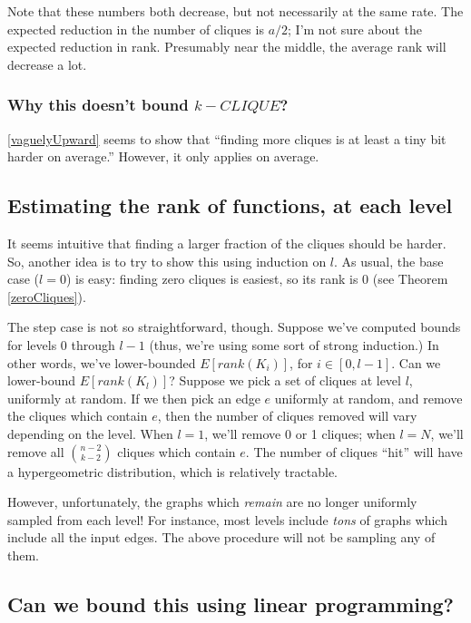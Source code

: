 \documentclass[12pt]{article}
\theoremstyle{definition}
\begin{document}
Note that these numbers both decrease, but not necessarily at the same rate.
The expected reduction in the number of cliques is $a/2$; I'm not sure
about the expected reduction in rank. Presumably near the middle, the
average rank will decrease a lot.

\subsubsection{Why this doesn't bound $k-CLIQUE$?}

\ref{vaguelyUpward} seems to show that ``finding more cliques is
at least a tiny bit harder on average.'' However, it only applies
on average.

\subsection{Estimating the rank of functions, at each level}

It seems intuitive that finding a larger fraction of the cliques
should be harder.
So, another idea is to try to show this using induction on $l$.
As usual, the base case ($l=0$) is easy: finding zero cliques is easiest,
so its rank is 0 (see Theorem \ref{zeroCliques}).

The step case is not so straightforward, though. Suppose we've computed bounds for
levels 0 through $l-1$ (thus, we're using some sort of strong induction.)
In other words, we've lower-bounded $E[rank(K_i)]$, for $i \in [0,l-1]$.
Can we lower-bound $E[rank(K_l)]$?
Suppose we pick a set of cliques at level $l$, uniformly at random.
If we then pick an edge $e$ uniformly at random, and remove the cliques
which contain $e$, then the number of cliques removed will vary
depending on the level. When $l=1$, we'll remove 0 or 1 cliques; when $l=N$,
we'll remove all ${n-2 \choose k-2}$ cliques which contain $e$.
The number of cliques ``hit'' will have a hypergeometric distribution,
which is relatively tractable.

However, unfortunately, the graphs which {\em remain} are no longer uniformly
sampled from each level! For instance, most levels include {\em tons} of
graphs which include all the input edges. The above procedure will not
be sampling any of them.

\subsection{Can we bound this using linear programming?}
\end{document}
